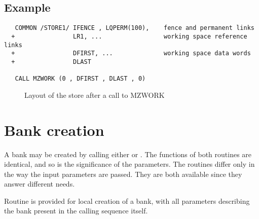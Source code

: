 \subsection{Example}
\begin{verbatim}
   COMMON /STORE1/ IFENCE , LQPERM(100),    fence and permanent links
  +                LR1, ...                 working space reference links
  +                DFIRST, ...              working space data words
  +                DLAST
 
   CALL MZWORK (0 , DFIRST , DLAST , 0)
\end{verbatim}
\begin{figure}[h]
\caption{Layout of the store after a call to MZWORK}
\label{FMZWORK}
\end{figure}
\section{Bank creation}
\par A bank may be created by calling either  or .
The functions of both routines are identical, and so is the
significance of the parameters. The routines differ only in the way the
input parameters are passed. They are both available since they
answer different needs.
\par Routine
 is provided for local creation of a bank, with all parameters
describing the bank present in the calling sequence itself.
\Idesc
